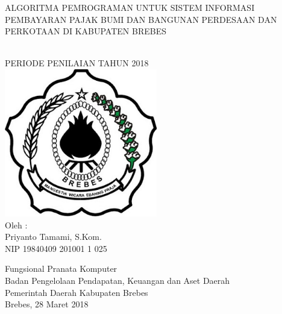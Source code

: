 \begin{titlepage}

\begin{center}
{\large ALGORITMA PEMROGRAMAN UNTUK SISTEM INFORMASI PEMBAYARAN PAJAK BUMI DAN BANGUNAN PERDESAAN DAN PERKOTAAN DI KABUPATEN BREBES}

\HRule\\[1cm]

PERIODE PENILAIAN TAHUN 2018\\[1cm]

\includegraphics[width=0.5\textwidth]{./resources/logo}\\[1cm]

Oleh :\\
Priyanto Tamami, S.Kom.\\
NIP 19840409 201001 1 025\\


\vfill


Fungsional Pranata Komputer\\
Badan Pengelolaan Pendapatan, Keuangan dan Aset Daerah\\
Pemerintah Daerah Kabupaten Brebes\\
Brebes, 28 Maret 2018
\end{center}

\end{titlepage}